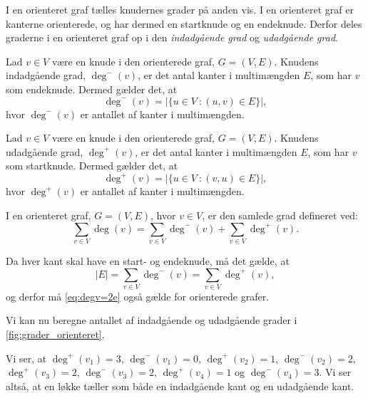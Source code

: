 I en orienteret graf tælles knudernes grader på anden vis. I en orienteret graf er kanterne orienterede, og har dermed en startknude og en endeknude. Derfor deles graderne i en orienteret graf op i den \emph{indadgående grad} og \emph{udadgående grad}. 

\begin{defn}
Lad $v \in V$ være en knude i den orienterede graf, $G = (V,E)$. Knudens indadgående grad, $\deg^-(v)$, er det antal kanter i multimængden $E$, som har $v$ som endeknude. Dermed gælder det, at
\begin{equation}
\deg^-(v)=|\{u \in V\ : (u,v) \in E \}|,
\end{equation}
hvor $\deg^-(v)$ er antallet af kanter i multimængden.
\end{defn}

\begin{defn}
Lad $v \in V$ være en knude i den orienterede graf, $G = (V,E)$. Knudens udadgående grad, $\deg^+(v)$, er det antal kanter i multimængden $E$, som har $v$ som startknude. Dermed gælder det, at
\begin{equation}
\deg^+(v)=|\{u \in V\ : (v,u) \in E \}|,
\end{equation}
hvor $\deg^+(v)$ er antallet af kanter i multimængden.
\end{defn}

\begin{defn}
I en orienteret graf, $G = (V,E)$, hvor $v \in V$, er den samlede grad defineret ved: 
\begin{equation}
\sum_{v \in V} { } \deg(v) = \sum_{v \in V} { } \deg^{-}(v) + \sum_{v \in V} { } \deg^{+}(v).
\end{equation}
\end{defn}

Da hver kant skal have en start- og endeknude, må det gælde, at 
\begin{equation}
|E|= \sum_{v \in V} { } \deg^{-}(v) = \sum_{v \in V} { } \deg^{+}(v),
\end{equation}
og derfor må \autoref{eq:degv=2e} også gælde for orienterede grafer.

%
%
%
%
%
%
%
%
%
%


\begin{exmp} \label{ex:grader_orienteret}
Vi kan nu beregne antallet af indadgående og udadgående grader i \autoref{fig:grader_orienteret}.

Vi ser, at $\deg^{+}(v_{1})=3$, $\deg^{-}(v_{1})=0$, $\deg^{+}(v_{2})=1$, $\deg^{-}(v_{2})=2$, $\deg^{+}(v_{3})=2$, $\deg^{-}(v_{3})=2$, $\deg^{+}(v_{4})=1$ og $\deg^{-}(v_{4})=3$. Vi ser altså, at en løkke tæller som både en indadgående kant og en udadgående kant.
\end{exmp}

